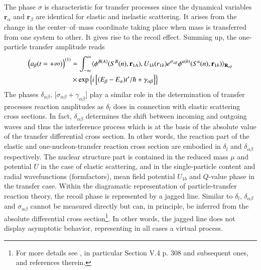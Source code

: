 \begin{subappendices}
\begin{align}
\end{align} 
 The phase $\sigma$ is characteristic for transfer processes since the dynamical variables $\mathbf r_\alpha$ and $\mathbf r_\beta$ are identical for elastic and inelastic scattering. It arises from the change in the center--of--mass coordinate taking place when mass is transferred from one system to other. It gives rise to the recoil effect.  Summing up, the one-particle transfer amplitude reads
 \begin{align}\label{eq1.D.37}
\nonumber \left(a_\beta(t=+\infty)\right)^{(1)}&=\int_{-\infty}^{\infty}\langle {\phi^{B(A)}(S^B(n),\mathbf r_{1A}),U_{1b}(r_{1b})e^{\sigma_{\alpha\beta}}\phi^{a(b)}(S^a(n),\mathbf r_{1b})} \rangle_{\mathbf R_{\alpha\beta}}\\
&\times\exp\left\{i\left[(E_\beta-E_\alpha)t'/\hbar+\gamma_{\alpha\beta}\right]\right\}
 \end{align}
 The phases $\delta_{\alpha\beta}$, [$\sigma_{\alpha\beta}+\gamma_{\alpha\beta}$] play a similar role in the determination of transfer processes reaction amplitudes as $\delta_l$ does in connection with elastic scattering cross sections. In fact, $\delta_{\alpha\beta}$ determines the shift between incoming and outgoing waves and thus the interference process which is at the basis of the absolute value of the transfer differential cross section. In other words, the reaction part of the elastic and one-nucleon-transfer reaction cross section are embodied in $\delta_l$ and $\delta_{\alpha\beta}$ respectively. The nuclear structure part is contained in the reduced mass $\mu$ and potential $U$ in the case of elastic scattering, and in the single-particle content and radial wavefunctions (formfactors), mean field potential $U_{1b}$ and $Q$-value phase in the transfer case. Within the diagramatic representation of particle-transfer reaction theory, the recoil phase is represented by a jagged line. Similar to $\delta_l$, $\delta_{\alpha\beta}$  and $\sigma_{\alpha\beta}$ cannot be measured directly but can, in principle,  be inferred from the absolute differential cross section\footnote{For more details see \cite{Broglia:04a}, in particular Section V.4 p. 308 and subsequent ones, and references therein.}. In other words, the jagged line does not display asymptotic behavior, representing in all cases a virtual process.  
 
 
 

\end{subappendices}
